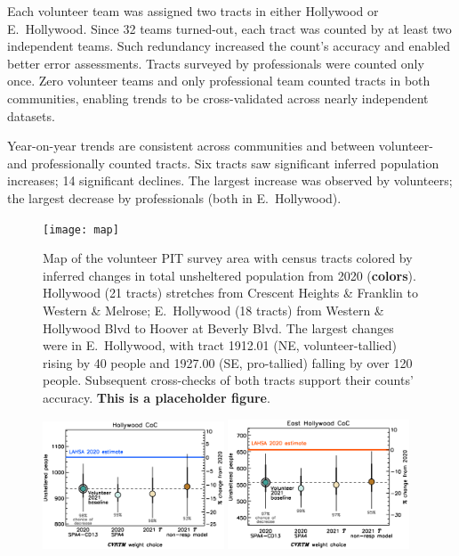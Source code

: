 \documentclass[11pt]{article}
\def\bfr{\bf\color{red}}
\begin{document}
Each volunteer team was assigned two tracts in either Hollywood or E.~Hollywood. Since 32 teams 
turned-out, each tract was counted by at least two independent teams. Such redundancy increased the 
count's accuracy and enabled better error assessments. Tracts surveyed by professionals were 
counted only once. Zero volunteer teams and only professional team counted tracts in both 
communities, enabling trends to be cross-validated across nearly independent datasets.

Year-on-year trends are consistent across communities and between volunteer- and professionally counted tracts.
Six tracts saw significant inferred population increases; 14 significant declines. The largest 
increase was observed by volunteers; the largest decrease by professionals (both in E.~Hollywood).\\

\begin{figure}[h]
	\centering
	\texttt{[image: map]}
	\caption{Map of the volunteer PIT survey area with census tracts colored by inferred 
			changes in total unsheltered population from 2020 ({\bfr colors}).
			Hollywood (21 tracts) stretches from Crescent Heights \& Franklin to 
			Western \& Melrose; E.~Hollywood (18 tracts) from Western \& Hollywood 
			Blvd to Hoover at Beverly Blvd. The largest changes were in E.~Hollywood,
			with tract 1912.01 (NE, volunteer-tallied) rising by 40 people and 1927.00 
			(SE, pro-tallied) falling by over 120 people. Subsequent cross-checks of both
			tracts support their counts' accuracy. {\bfr This is a placeholder figure}.}
	\label{fig:tcomp}
\end{figure}

\begin{figure}[h]
	\centering
	\includegraphics[width = 0.48\textwidth, trim = 1cm 0cm 0cm 1cm]{hwoodFinal}
	\includegraphics[width = 0.48\textwidth, trim = 1cm 0cm 0cm 1cm]{ehoFinal}
	\caption{}
	\label{fig:wtComp}
\end{figure}
\end{document}
